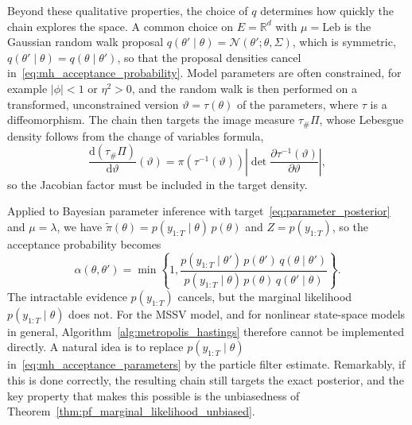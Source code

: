 Beyond these qualitative properties, the choice of $q$ determines how quickly the chain explores the space. A common choice on $E = \mathbb{R}^d$ with $\mu = \mathrm{Leb}$ is the Gaussian random walk proposal $q(\theta'\mid\theta) = \mathcal{N}(\theta';\theta,\Sigma)$, which is symmetric, $q(\theta'\mid\theta) = q(\theta\mid\theta')$, so that the proposal densities cancel in~\eqref{eq:mh_acceptance_probability}. Model parameters are often constrained, for example $|\phi|<1$ or $\eta^2>0$, and the random walk is then performed on a transformed, unconstrained version $\vartheta = \tau(\theta)$ of the parameters, where $\tau$ is a diffeomorphism. The chain then targets the image measure $\tau_\#\Pi$, whose Lebesgue density follows from the change of variables formula,
\begin{equation}
    \frac{\mathrm{d}(\tau_\#\Pi)}{\mathrm{d}\vartheta}(\vartheta) = \pi\left(\tau^{-1}(\vartheta)\right)\left|\det\frac{\partial\tau^{-1}(\vartheta)}{\partial\vartheta}\right|,
\end{equation}
so the Jacobian factor must be included in the target density.

Applied to Bayesian parameter inference with target~\eqref{eq:parameter_posterior} and $\mu = \lambda$, we have $\tilde{\pi}(\theta) = p(y_{1:T}\mid\theta)\,p(\theta)$ and $Z = p(y_{1:T})$, so the acceptance probability becomes
\begin{equation}
    \alpha(\theta,\theta') = \min\left\{1,\frac{p(y_{1:T}\mid\theta')\,p(\theta')\,q(\theta\mid\theta')}{p(y_{1:T}\mid\theta)\,p(\theta)\,q(\theta'\mid\theta)}\right\}.
    \label{eq:mh_acceptance_parameters}
\end{equation}
The intractable evidence $p(y_{1:T})$ cancels, but the marginal likelihood $p(y_{1:T}\mid\theta)$ does not. For the MSSV model, and for nonlinear state-space models in general, Algorithm~\ref{alg:metropolis_hastings} therefore cannot be implemented directly. A natural idea is to replace $p(y_{1:T}\mid\theta)$ in~\eqref{eq:mh_acceptance_parameters} by the particle filter estimate. Remarkably, if this is done correctly, the resulting chain still targets the exact posterior, and the key property that makes this possible is the unbiasedness of Theorem~\ref{thm:pf_marginal_likelihood_unbiased}.

